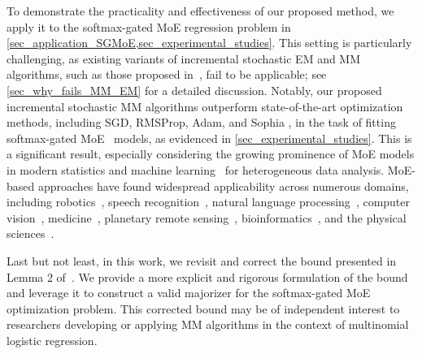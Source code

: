 \documentclass{article}
\newcommand{\md}{softmax-gated MoE }
\begin{document}
To demonstrate the practicality and effectiveness of our proposed method, we apply it to the \md regression problem in \cref{sec_application_SGMoE,sec_experimental_studies}. This setting is particularly challenging, as existing variants of incremental stochastic EM and MM algorithms, such as those proposed in~\cite{cappe_Online_2009,cappe_online_2011,nguyen_mini_batch_2020,karimi_global_2019}, fail to be applicable; see \cref{sec_why_fails_MM_EM} for a detailed discussion. Notably, our proposed incremental stochastic MM algorithms outperform state-of-the-art optimization methods, including SGD, RMSProp, Adam, and Sophia \cite{liu_sophia_2024}, in the task of fitting \md~models, as evidenced in \cref{sec_experimental_studies}. This is a significant result, especially considering the growing prominence of MoE models in modern statistics and machine learning~\citep{dai_deepseekmoe_2024,zhang_moefication_2022,chen_sparse_2023,fedus_switch_2022,do_hyperrouter_2023,pham_competesmoeeffective_2024,guo_deepseek_r1_2025,jiang_mixtral_2024} for heterogeneous data analysis. MoE-based approaches have found widespread applicability across numerous domains, including robotics~\cite{jaquier2021tensor}, speech recognition~\cite{you_speechmoe2_2022}, natural language processing~\cite{do_hyperrouter_2023,pham_competesmoeeffective_2024,puigcerver_sparse_2024}, computer vision~\cite{lathuiliere_deep_2017}, medicine~\cite{li_drug_2019,boux2021}, planetary remote sensing~\cite{forbes_summary_2022,kugler2022,deleforge2015hyper}, bioinformatics~\cite{blein_nicolas_nonlinear_2024,nguyen_joint_2024}, and the physical sciences~\cite{kuusela_semi_supervised_2012}.

Last but not least, in this work, we revisit and correct the bound presented in Lemma 2 of~\cite{bohning1992multinomial}. We provide a more explicit and rigorous formulation of the bound and leverage it to construct a valid majorizer for the softmax-gated MoE optimization problem. This corrected bound may be of independent interest to researchers developing or applying MM algorithms in the context of multinomial logistic regression.
\end{document}
